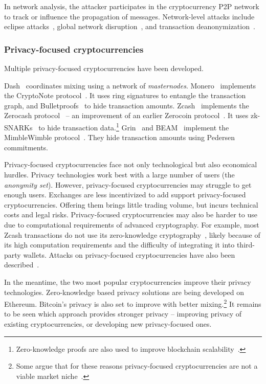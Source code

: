 In network analysis, the attacker participates in the cryptocurrency P2P network to track or influence the propagation of messages.
Network-level attacks include eclipse attacks~\cite{Marcus2018, Henningsen2019}, global network disruption~\cite{Apostolaki2017}, and transaction deanonymization~\cite{Biryukov2014}.


\subsubsection*{Privacy-focused cryptocurrencies}

Multiple privacy-focused cryptocurrencies have been developed.

Dash~\cite{Dash} coordinates mixing using a network of \textit{masternodes}.
Monero~\cite{Monero} implements the CryptoNote protocol~\cite{Saberhagen2013}.
It uses ring signatures to entangle the transaction graph, and Bulletproofs~\cite{Buenz2018} to hide transaction amounts.
Zcash~\cite{Zcash} implements the Zerocash protocol~\cite{BenSasson2014, Hopwood2020} -- an improvement of an earlier Zerocoin protocol~\cite{Miers2013}.
It uses zk-SNARKs~\cite{BenSasson2014a} to hide transaction data.\footnote{Zero-knowledge proofs are also used to improve blockchain scalability~\cite{Bonneau2020}.}
Grin~\cite{Grin} and BEAM~\cite{Beam} implement the MimbleWimble protocol~\cite{Jedusor2016}.
They hide transaction amounts using Pedersen commitments.

Privacy-focused cryptocurrencies face not only technological but also economical hurdles.
Privacy technologies work best with a large number of users (the \textit{anonymity set}).
However, privacy-focused cryptocurrencies may struggle to get enough users.
Exchanges are less incentivized to add support privacy-focused cryptocurrencies.
Offering them brings little trading volume, but incurs technical costs and legal risks.
Privacy-focused cryptocurrencies may also be harder to use due to computational requirements of advanced cryptography.
For example, most Zcash transactions do not use its zero-knowledge cryptography~\cite{Quesnelle2017, Biryukov2019c}, likely because of its high computation requirements and the difficulty of integrating it into third-party wallets.
Attacks on privacy-focused cryptocurrencies have also been described~\cite{Quesnelle2017, Moeser2018, Biryukov2019d, Biryukov2019e, Tramer2020}.

In the meantime, the two most popular cryptocurrencies improve their privacy technologies.
Zero-knowledge based privacy solutions are being developed on Ethereum.
Bitcoin's privacy is also set to improve with better mixing.\footnote{Some argue that for these reasons privacy-focused cryptocurrencies are not a viable market niche~\cite{Gentry2019}.}
It remains to be seen which approach provides stronger privacy -- improving privacy of existing cryptocurrencies, or developing new privacy-focused ones.



